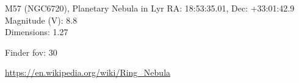 \begin{block}{M57 (NGC6720), Planetary Nebula in Lyr}
    RA: 18:53:35.01, Dec: +33:01:42.9 \\ 
    Magnitude (V): 8.8 \\ 
    Dimensions: 1.27 

    Finder fov: 30 

    \url{https://en.wikipedia.org/wiki/Ring_Nebula} 
\end{block}